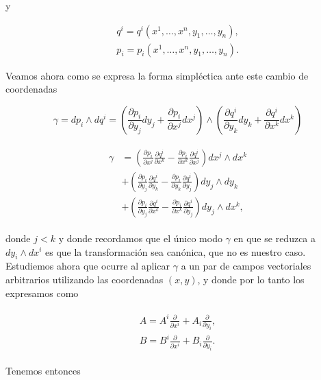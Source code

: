 \documentclass[a4paper,10pt]{article}
\numberwithin{equation}{section}
\begin{document}
y 

\begin{align}
 q^i = q^i(x^1,\dots,x^n,y_1,\dots,y_n), \\
 p_i = p_i(x^1,\dots,x^n,y_1,\dots,y_n).
\end{align}

Veamos ahora como se expresa la forma simpléctica ante este cambio de coordenadas

\begin{equation}
 \gamma = dp_i \wedge dq^i = \left(\frac{\partial p_i}{\partial y_j}dy_j + 
 \frac{\partial p_i}{\partial x^j}dx^j\right) \wedge 
 \left(\frac{\partial q^i}{\partial y_k}dy_k + 
 \frac{\partial q^i}{\partial x^k}dx^k\right)
\end{equation}

\begin{align}
\begin{split}
 \gamma &= \left(\frac{\partial p_i}{\partial x^j}\frac{\partial q^i}{\partial x^k} 
 - \frac{\partial p_i}{\partial x^k}\frac{\partial q^i}{\partial x^j}\right)dx^j \wedge dx^k \\
 &+ \left(\frac{\partial p_i}{\partial y_j}\frac{\partial q^i}{\partial y_k} 
 - \frac{\partial p_i}{\partial y_k}\frac{\partial q^i}{\partial y_j}\right)dy_j \wedge dy_k \\
 &+ \left(\frac{\partial p_i}{\partial y_j}\frac{\partial q^i}{\partial x^k} 
 - \frac{\partial p_i}{\partial x^k}\frac{\partial q^i}{\partial y_j}\right)dy_j \wedge dx^k,
\end{split}
\end{align}

donde $j < k$ y donde recordamos que el único modo $\gamma$ en que se reduzca 
a $dy_i \wedge dx^i$ es que la transformación sea canónica, que no es nuestro caso. Estudiemos 
ahora que ocurre al aplicar $\gamma$ a un par de campos vectoriales arbitrarios utilizando 
las coordenadas $(x,y)$, y donde por lo tanto los expresamos como 

\begin{align}
 \begin{split}
  A = A^i\frac{\partial}{\partial x^i} + A_i \frac{\partial}{\partial y_i}, \\
  B = B^i\frac{\partial}{\partial x^i} + B_i \frac{\partial}{\partial y_i}.
 \end{split}
\end{align}

Tenemos entonces 
\end{document}
